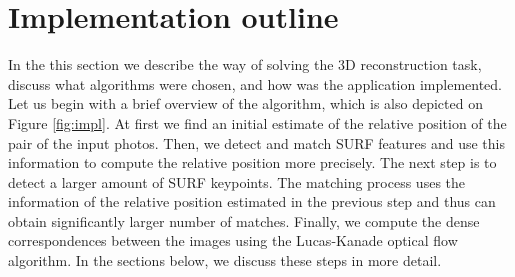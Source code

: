 
\section{Implementation outline}
\label{sec:impl_outline}
In the this section we describe the way of solving the 3D reconstruction task, discuss what algorithms were chosen, and how was the application implemented.
Let us begin with a brief overview of the algorithm, which is also depicted on Figure \ref{fig:impl}.
At first we find an initial estimate of the relative position of the pair of the input photos.
Then, we detect and match SURF features and use this information to compute the relative position more precisely. 
The next step is to detect a larger amount of SURF keypoints. 
The matching process uses the information of the relative position estimated in the previous step and thus can obtain significantly larger number of matches.
Finally, we compute the dense correspondences between the images using the Lucas-Kanade optical flow algorithm.
In the sections below, we discuss these steps in more detail. 

